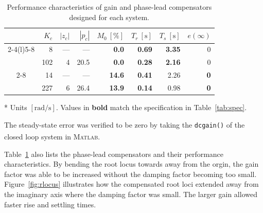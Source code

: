 \documentclass[a4paper,10pt,twocolumn]{article}
\newcommand{\Matlab}{\textsc{Matlab}\textsuperscript{\textregistered}\xspace}
\begin{document}
\begin{table}[h!]
	\centering
	\footnotesize
	\begin{threeparttable}
		\caption{Performance characteristics of gain and phase-lead compensators designed for each system.}
		\label{tab:compensation}
		\renewcommand{\arraystretch}{1.2}
		\setlength{\tabcolsep}{3pt}
		\begin{tabular}{@{}crrrrrrr@{}}
			\toprule
			&
				$K_c$ &
				$\left|z_c\right|$\tnote{*} &
				$\left|p_c\right|$\tnote{*} &
				$M_0~[\si{\%}]$ &
				$T_r~[\si{\second}]$ &
				$T_s~[\si{\second}]$ &
				$e(\infty)$ \\
			\cmidrule(r){2-4}\cmidrule(l){5-8}
			\multirow{2}{*}{
				\begin{sideways}\tiny
					\textsc{System 1}
				\end{sideways}
			}
			& 8 & --- & --- &
				\textbf{0.0} & \textbf{0.69} & \textbf{3.35} & 0 \\
			& 102 & 4 & 20.5 &
				\textbf{0.0} & \textbf{0.28} & \textbf{2.16} & 0 \\
			\cmidrule{2-8}
			\multirow{2}{*}{
				\begin{sideways}\tiny
					\textsc{System 2}
				\end{sideways}
			}
			& 14 & --- & --- &
				\textbf{14.6} & \textbf{0.41} & 2.26 & \textbf{0} \\
			& 227 & 6 & 26.4 &
				\textbf{13.9} & \textbf{0.14} & 0.98 & \textbf{0} \\
			\bottomrule
		\end{tabular}
		\begin{tablenotes}
			\item[*] Units $[\si{\radian\per\second}]$. Values in \textbf{bold} match the specification in Table~\ref{tab:spec}.			
		\end{tablenotes}
	\end{threeparttable}
\end{table}

The steady-state error was verified to be zero by taking the \texttt{dcgain()} of the closed loop system in \Matlab.

Table~\ref{tab:compensation} also lists the phase-lead compensators and their performance characteristics. By bending the root locus towards away from the orgin, the gain factor was able to be increased without the damping factor becoming too small. Figure~\ref{fig:rlocus} illustrates how the compensated root loci extended away from the imaginary axis where the damping factor was small. The larger gain allowed faster rise and settling times.
\end{document}
